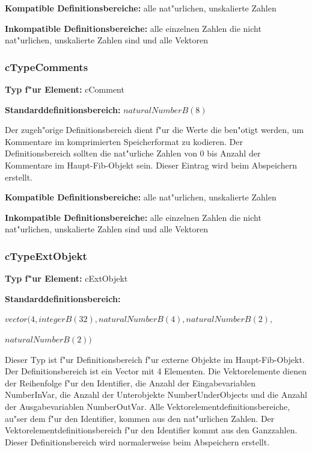 \bigskip\noindent
\textbf{Kompatible Definitionsbereiche:} alle nat"urlichen, unskalierte Zahlen

\bigskip\noindent
\textbf{Inkompatible Definitionsbereiche:} alle einzelnen Zahlen die nicht nat"urlichen, unskalierte Zahlen sind und alle Vektoren



\subsubsection{cTypeComments}

\textbf{Typ f"ur Element:} cComment

\bigskip\noindent
\textbf{Standarddefinitionsbereich:} $naturalNumberB(8)$

Der zugeh"orige Definitionsbereich dient f"ur die Werte die ben"otigt werden, um Kommentare im komprimierten Speicherformat zu kodieren. Der Definitionsbereich sollten die nat"urliche Zahlen von 0 bis Anzahl der Kommentare im Haupt-Fib-Objekt sein. Dieser Eintrag wird beim Abspeichern erstellt.

\bigskip\noindent
\textbf{Kompatible Definitionsbereiche:} alle nat"urlichen, unskalierte Zahlen

\bigskip\noindent
\textbf{Inkompatible Definitionsbereiche:} alle einzelnen Zahlen die nicht nat"urlichen, unskalierte Zahlen sind und alle Vektoren


\subsubsection{cTypeExtObjekt}

\textbf{Typ f"ur Element:} cExtObjekt

\bigskip\noindent
\textbf{Standarddefinitionsbereich:}

$vector( 4 , integerB(32), naturalNumberB(4), naturalNumberB(2),$

$naturalNumberB(2) )$

Dieser Typ ist f"ur Definitionsbereich f"ur externe Objekte im Haupt-Fib-Objekt. Der Definitionsbereich ist ein Vector mit 4 Elementen. Die Vektorelemente dienen der Reihenfolge f"ur den Identifier, die Anzahl der Eingabevariablen NumberInVar, die Anzahl der Unterobjekte NumberUnderObjects und die Anzahl der Ausgabevariablen NumberOutVar. Alle Vektorelementdefinitionsbereiche, au"ser dem f"ur den Identifier, kommen aus den nat"urlichen Zahlen. Der Vektorelementdefinitionsbereich f"ur den Identifier kommt aus den Ganzzahlen. Dieser Definitionsbereich wird normalerweise beim Abspeichern erstellt.

